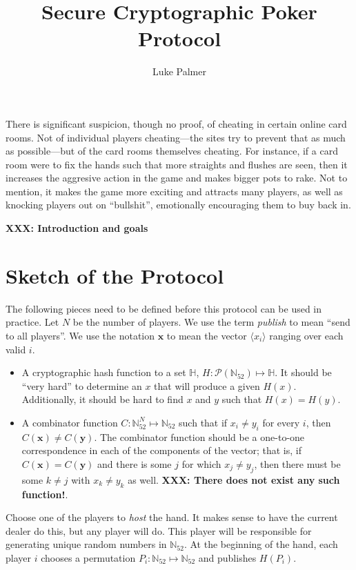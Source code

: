 \documentclass[12pt]{article}
\title{Secure Cryptographic Poker Protocol}
\author{Luke Palmer}
\newcommand{\XXX}[1]{\textbf{XXX: #1}}
\newcommand{\carddom}{\mathbb{N}_{52}}
\begin{document}
\maketitle

There is significant suspicion, though no proof, of cheating in certain
online card rooms.  Not of individual players cheating---the sites try
to prevent that as much as possible---but of the card rooms themselves
cheating.  For instance, if a card room were to fix the hands such that
more straights and flushes are seen, then it increases the aggresive
action in the game and makes bigger pots to rake.  Not to mention, it
makes the game more exciting and attracts many players, as well as
knocking players out on ``bullshit'', emotionally encouraging them to
buy back in.

\XXX{Introduction and goals}

\section{Sketch of the Protocol}

The following pieces need to be defined before this protocol can be used
in practice.  Let $N$ be the number of players.  We use the term
\textit{publish} to mean ``send to all players''.  We use the notation
$\mathbf{x}$ to mean the vector $\langle x_i \rangle$ ranging over each
valid $i$.

\begin{itemize}
\item A cryptographic hash function to a set $\mathbb{H}$, $H:
\mathcal{P}(\carddom) \mapsto \mathbb{H}$.  It should be  ``very hard''
to determine an $x$ that will produce a given $H(x)$.  Additionally, it
should be hard to find $x$ and $y$ such that $H(x) = H(y)$.
\item A combinator function $C: \carddom^N \mapsto \carddom$ such that
if $x_i \not= y_i$ for every $i$, then $C(\mathbf{x}) \not=
C(\mathbf{y})$.  The combinator function should be a one-to-one
correspondence in each of the components of the vector; that is, if
$C(\mathbf{x}) = C(\mathbf{y})$ and there is some $j$ for which $x_j
\not= y_j$, then there must be some $k \not= j$ with $x_k \not= y_k$ as
well.  \XXX{There does not exist any such function!}.
\end{itemize}

Choose one of the players to \textit{host} the hand.  It makes sense to
have the current dealer do this, but any player will do.  This player
will be responsible for generating unique random numbers in $\carddom$.
At the beginning of the hand, each player $i$ chooses a permutation
$P_i: \carddom \mapsto \carddom$ and publishes $H(P_i)$.  
\end{document}
